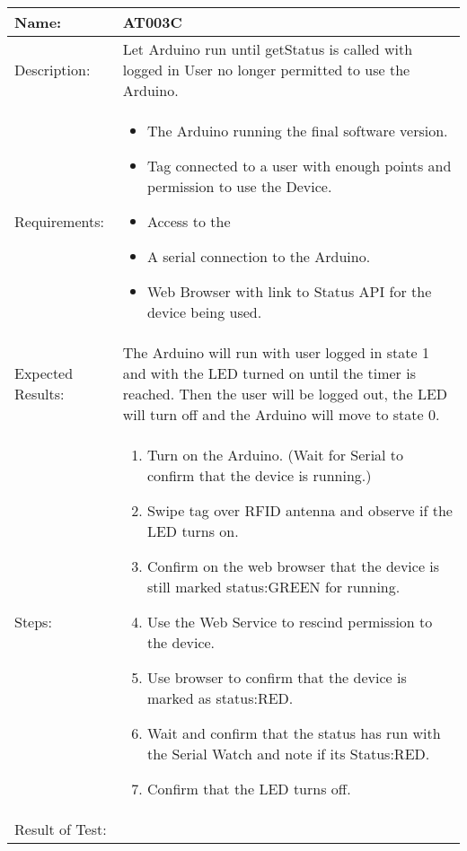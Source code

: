 \begin{table}[h]
	\centering
		\begin{tabular*}{\textwidth}{|l|l|}
		\hline
		\hline
		Name: & AT003C\\
		\hline
		Description: & Let Arduino run until getStatus is called with logged in User no longer permitted to use the Arduino.\\
		\hline
		Requirements: & \parbox{0.85\textwidth}{
		\begin{itemize}
			\item The Arduino running the final software version.
			\item Tag connected to a user with enough points and permission to use the Device.
			\item Access to the 
			\item A serial connection to the Arduino.
			\item Web Browser with link to Status API for the device being used.
		\end{itemize}}
		\\
		\hline
		Expected Results: & \parbox{.85\textwidth}{The Arduino will run with user logged in state 1 and with the LED turned on until the timer is reached. 
		Then the user will be logged out, the LED will turn off and the Arduino will move to state 0.}\\
		\hline
		Steps: & \parbox{.85\textwidth}{
		\begin{enumerate}
			\item Turn on the Arduino. (Wait for Serial to confirm that the device is running.)
			\item Swipe tag  over RFID antenna and observe if the LED turns on.
			\item Confirm on the web browser that the device is still marked status:GREEN for running.
			\item Use the Web Service to rescind permission to the device.
			\item Use browser to confirm that the device is marked as status:RED.
			\item Wait and confirm that the status has run with the Serial Watch and note if its Status:RED.
			\item Confirm that the LED turns off.
		\end{enumerate}}
		\\		
		\hline
		Result of Test: & \\
		\hline
		\end{tabular*}
\end{table}
